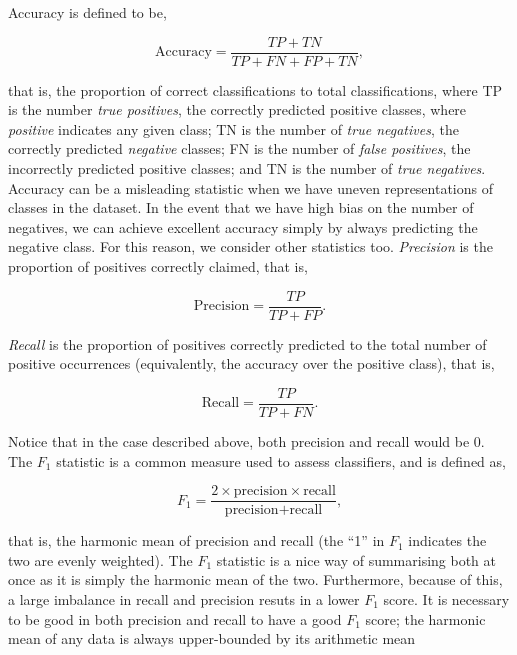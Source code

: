 Accuracy is defined to be,

\begin{equation}
\text{Accuracy} = \frac{TP + TN}{TP + FN + FP + TN},
\label{eq:accuracy}
\end{equation}

that is, the proportion of correct classifications to total classifications, where TP is the number \emph{true positives}, the correctly predicted positive classes, where \emph{positive} indicates any given class; TN is the number of \emph{true negatives}, the correctly predicted \emph{negative} classes; FN is the number of \emph{false positives}, the incorrectly predicted positive classes; and TN is the number of \emph{true negatives}. Accuracy can be a misleading statistic when we have uneven representations of classes in the dataset. In the event that we have high bias on the number of negatives, we can achieve excellent accuracy simply by always predicting the negative class. For this reason, we consider other statistics too. \emph{Precision} is the proportion of positives correctly claimed, that is,

\begin{equation}
\text{Precision} = \frac{TP}{TP + FP}.
\label{eq:precision}
\end{equation}

\emph{Recall} is the proportion of positives correctly predicted to the total number of positive occurrences (equivalently, the accuracy over the positive class), that is,

\begin{equation}
\text{Recall} = \frac{TP}{TP + FN}.
\label{eq:recall}
\end{equation}

Notice that in the case described above, both precision and recall would be 0. The $F_1$ statistic is a common measure used to assess classifiers, and is defined as,

\begin{equation}
F_1 = \frac{2 \times \text{precision} \times \text{recall}}{\text{precision} + \text{recall}},
\label{eq:f1}
\end{equation}

that is, the harmonic mean of precision and recall (the ``1'' in $F_1$ indicates the two are evenly weighted). The $F_1$ statistic is a nice way of summarising both at once as it is simply the harmonic mean of the two. Furthermore, because of this, a large imbalance in recall and precision resuts in a lower $F_1$ score. It is necessary to be good in both precision and recall to have a good $F_1$ score; the harmonic mean of any data is always upper-bounded by its arithmetic mean

